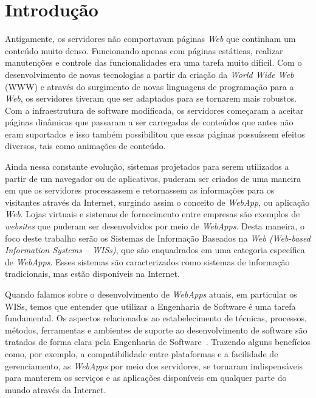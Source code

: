 
\section{Introdução}
\label{sec-intro}


Antigamente, os servidores não comportavam páginas \textit{Web} que continham um conteúdo muito denso. Funcionando apenas com páginas estáticas, realizar manutenções e controle das funcionalidades era uma tarefa muito difícil. Com o desenvolvimento de novas tecnologias a partir da criação da \textit{World Wide Web} (WWW) e através do surgimento de novas linguagens de programação para a \textit{Web}, os servidores tiveram que ser adaptados para se tornarem mais robustos. Com a infraestrutura de software modificada, os servidores começaram a aceitar páginas dinâmicas que passaram a ser carregadas de conteúdos que antes não eram suportados e isso também possibilitou que essas páginas possuíssem efeitos diversos, tais como animações de conteúdo.

Ainda nessa constante evolução, sistemas projetados para serem utilizados a partir de um navegador ou de aplicativos, puderam ser criados de uma maneira em que os servidores processassem e retornassem as informações para os visitantes através da Internet, surgindo assim o conceito de \textit{WebApp}, ou aplicação \textit{Web}. Lojas virtuais e sistemas de fornecimento entre empresas são exemplos de \textit{websites} que puderam ser desenvolvidos por meio de \textit{WebApps}. Desta maneira, o foco deste trabalho serão os Sistemas de Informação Baseados na \textit{Web (Web-based Information Systems – WISs)}, que são enquadrados em uma categoria específica de \textit{WebApps}. Esses sistemas são caracterizados como sistemas de informação tradicionais, mas estão disponíveis na Internet.

Quando falamos sobre o desenvolvimento de \textit{WebApps} atuais, em particular os WISs, temos que entender que utilizar a Engenharia de Software é uma tarefa fundamental. Os aspectos relacionados ao estabelecimento de técnicas, processos, métodos, ferramentas e ambientes de suporte ao desenvolvimento de software são tratados de forma clara pela Engenharia de Software~\cite{falbo:es14}. Trazendo alguns benefícios como, por exemplo, a compatibilidade entre plataformas e a facilidade de gerenciamento, as \textit{WebApps} por meio dos servidores, se tornaram indispensáveis para manterem os serviços e as aplicações disponíveis em qualquer parte do mundo através da Internet.

